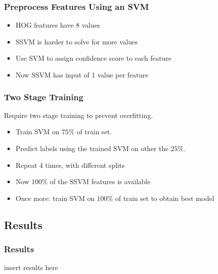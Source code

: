 \begin{frame}
\frametitle{Preprocess Features Using an SVM}
\begin{itemize}
\item HOG features have 8 values
\item SSVM is harder to solve for more values
\item Use SVM to assign confidence score to each feature
\item Now SSVM has input of 1 value per feature
\end{itemize}
\end{frame}

\begin{frame}
\frametitle{Two Stage Training}
Require two stage training to prevent overfitting.
\begin{itemize}
\item Train SVM on $75\%$ of train set.
\item Predict labels using the trained SVM on other the $25\%$.
\item Repeat 4 times, with different splits
\item Now $100\%$ of the SSVM features is available
\item Once more: train SVM on $100\%$ of train set to obtain best model
\end{itemize}
\end{frame}

\subsection{Results}

\begin{frame}
\frametitle{Results}
insert results here
\end{frame}
